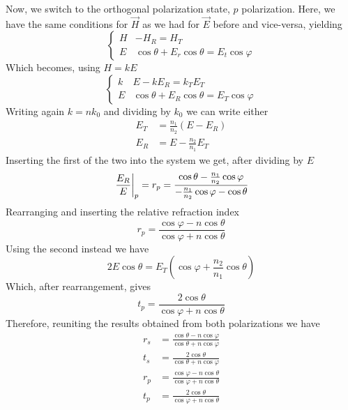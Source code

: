 \documentclass[../electromagnetism.tex]{subfiles}
\begin{document}
Now, we switch to the orthogonal polarization state, $p$ polarization. Here, we have the same conditions for $\vec{H}$ as we had for $\vec{E}$ before and vice-versa, yielding
\begin{equation*}
	\left\{ \begin{aligned}
		H&-H_R= H_T\\
		E&\cos\theta+E_r\cos\theta=E_t\cos\varphi
	\end{aligned}\right.
\end{equation*}
Which becomes, using $H=kE$
\begin{equation*}
	\left\{ \begin{aligned}
		k&E-kE_R=k_TE_T\\
		E&\cos\theta+E_R\cos\theta=E_T\cos\varphi
	\end{aligned}\right.
\end{equation*}
Writing again $k=nk_0$ and dividing by $k_0$ we can write either
\begin{equation*}
	\begin{aligned}
		E_T&= \frac{n_1}{n_2}(E-E_R)\\
		E_R&= E-\frac{n_2}{n_1}E_T
	\end{aligned}
\end{equation*}
Inserting the first of the two into the system we get, after dividing by $E$
\begin{equation*}
	\eval{\frac{E_R}{E}}_p=r_p=\frac{\cos\theta-\frac{n_1}{n_2}\cos\varphi}{-\frac{n_1}{n_2}\cos\varphi-\cos\theta}
\end{equation*}
Rearranging and inserting the relative refraction index
\begin{equation}
	r_p=\frac{\cos\varphi-n\cos\theta}{\cos\varphi+n\cos\theta}
	\label{eq:r_p1.ref}
\end{equation}
Using the second instead we have
\begin{equation*}
	2E\cos\theta=E_T\left( \cos\varphi+\frac{n_2}{n_1}\cos\theta \right)
\end{equation*}
Which, after rearrangement, gives
\begin{equation}
	t_p=\frac{2\cos\theta}{\cos\varphi+n\cos\theta}
	\label{eq:t_p1.ref}
\end{equation}
Therefore, reuniting the results obtained from both polarizations we have
\begin{equation}
	\begin{aligned}
		r_s&= \frac{\cos\theta-n\cos\varphi}{\cos\theta+n\cos\varphi}\\
		t_s&= \frac{2\cos\theta}{\cos\theta+n\cos\varphi}\\
		r_p&= \frac{\cos\varphi-n\cos\theta}{\cos\varphi+n\cos\theta}\\
		t_p&= \frac{2\cos\theta}{\cos\varphi+n\cos\theta}
	\end{aligned}
	\label{eq:rtsp.ref}
\end{equation}
\end{document}
